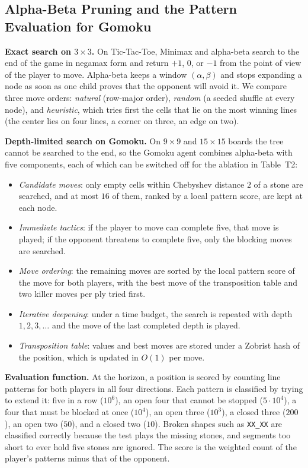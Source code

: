 \subsection{Alpha-Beta Pruning and the Pattern Evaluation for Gomoku}
\label{subsec:alphabeta}

\textbf{Exact search on $3\times 3$.} On Tic-Tac-Toe, Minimax and alpha-beta search to the end of the game in negamax form and return $+1$, $0$, or $-1$ from the point of view of the player to move. Alpha-beta keeps a window $(\alpha, \beta)$ and stops expanding a node as soon as one child proves that the opponent will avoid it. We compare three move orders: \emph{natural} (row-major order), \emph{random} (a seeded shuffle at every node), and \emph{heuristic}, which tries first the cells that lie on the most winning lines (the center lies on four lines, a corner on three, an edge on two).

\textbf{Depth-limited search on Gomoku.} On $9\times 9$ and $15\times 15$ boards the tree cannot be searched to the end, so the Gomoku agent combines alpha-beta with five components, each of which can be switched off for the ablation in Table~T2:
\begin{itemize}
    \item \emph{Candidate moves}: only empty cells within Chebyshev distance $2$ of a stone are searched, and at most $16$ of them, ranked by a local pattern score, are kept at each node.
    \item \emph{Immediate tactics}: if the player to move can complete five, that move is played; if the opponent threatens to complete five, only the blocking moves are searched.
    \item \emph{Move ordering}: the remaining moves are sorted by the local pattern score of the move for both players, with the best move of the transposition table and two killer moves per ply tried first.
    \item \emph{Iterative deepening}: under a time budget, the search is repeated with depth $1, 2, 3, \dots$ and the move of the last completed depth is played.
    \item \emph{Transposition table}: values and best moves are stored under a Zobrist hash of the position, which is updated in $O(1)$ per move.
\end{itemize}

\textbf{Evaluation function.} At the horizon, a position is scored by counting line patterns for both players in all four directions. Each pattern is classified by trying to extend it: five in a row ($10^6$), an open four that cannot be stopped ($5\cdot 10^4$), a four that must be blocked at once ($10^4$), an open three ($10^3$), a closed three ($200$), an open two ($50$), and a closed two ($10$). Broken shapes such as \texttt{XX\_XX} are classified correctly because the test plays the missing stones, and segments too short to ever hold five stones are ignored. The score is the weighted count of the player's patterns minus that of the opponent.
